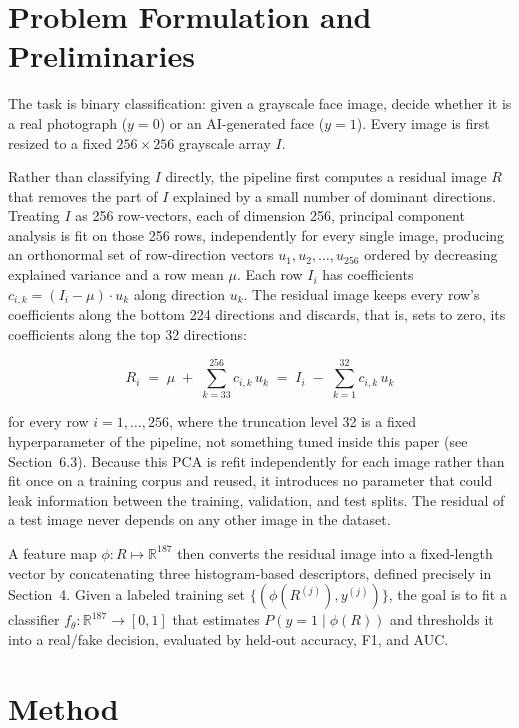 \documentclass[11pt]{article}
\begin{document}
\section{Problem Formulation and Preliminaries}

The task is binary classification: given a grayscale face image, decide whether it is a real photograph ($y = 0$) or an AI-generated face ($y = 1$). Every image is first resized to a fixed $256 \times 256$ grayscale array $I$.

Rather than classifying $I$ directly, the pipeline first computes a residual image $R$ that removes the part of $I$ explained by a small number of dominant directions. Treating $I$ as 256 row-vectors, each of dimension 256, principal component analysis is fit on those 256 rows, independently for every single image, producing an orthonormal set of row-direction vectors $u_1, u_2, \ldots, u_{256}$ ordered by decreasing explained variance and a row mean $\mu$. Each row $I_i$ has coefficients $c_{i,k} = (I_i - \mu) \cdot u_k$ along direction $u_k$. The residual image keeps every row's coefficients along the bottom 224 directions and discards, that is, sets to zero, its coefficients along the top 32 directions:

\begin{equation*}
R_i \;=\; \mu \;+\; \sum_{k=33}^{256} c_{i,k}\, u_k \;=\; I_i \;-\; \sum_{k=1}^{32} c_{i,k}\, u_k
\end{equation*}

for every row $i = 1, \ldots, 256$, where the truncation level 32 is a fixed hyperparameter of the pipeline, not something tuned inside this paper (see Section~6.3). Because this PCA is refit independently for each image rather than fit once on a training corpus and reused, it introduces no parameter that could leak information between the training, validation, and test splits. The residual of a test image never depends on any other image in the dataset.

A feature map $\phi : R \mapsto \mathbb{R}^{187}$ then converts the residual image into a fixed-length vector by concatenating three histogram-based descriptors, defined precisely in Section~4. Given a labeled training set $\{(\phi(R^{(j)}), y^{(j)})\}$, the goal is to fit a classifier $f_\theta : \mathbb{R}^{187} \to [0,1]$ that estimates $P(y=1 \mid \phi(R))$ and thresholds it into a real/fake decision, evaluated by held-out accuracy, F1, and AUC.

\section{Method}
\end{document}
